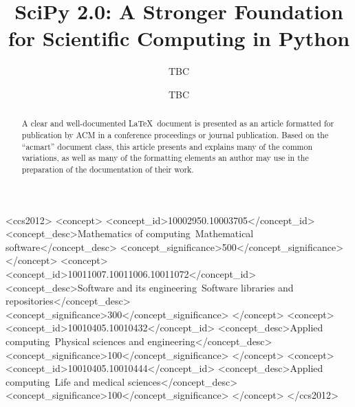 \documentclass[acmsmall]{acmart}
\begin{document}
\title{SciPy 2.0: A Stronger Foundation for Scientific Computing in Python}

\author{TBC}
\author{TBC}
\correspondingauthor
\authornotemark[1]

\renewcommand{\shortauthors}{TBC et al.}

\begin{abstract}
  A clear and well-documented \LaTeX\ document is presented as an
  article formatted for publication by ACM in a conference proceedings
  or journal publication. Based on the ``acmart'' document class, this
  article presents and explains many of the common variations, as well
  as many of the formatting elements an author may use in the
  preparation of the documentation of their work.
\end{abstract}

\begin{CCSXML}
<ccs2012>
   <concept>
       <concept_id>10002950.10003705</concept_id>
       <concept_desc>Mathematics of computing~Mathematical software</concept_desc>
       <concept_significance>500</concept_significance>
       </concept>
   <concept>
       <concept_id>10011007.10011006.10011072</concept_id>
       <concept_desc>Software and its engineering~Software libraries and repositories</concept_desc>
       <concept_significance>300</concept_significance>
       </concept>
   <concept>
       <concept_id>10010405.10010432</concept_id>
       <concept_desc>Applied computing~Physical sciences and engineering</concept_desc>
       <concept_significance>100</concept_significance>
       </concept>
   <concept>
       <concept_id>10010405.10010444</concept_id>
       <concept_desc>Applied computing~Life and medical sciences</concept_desc>
       <concept_significance>100</concept_significance>
       </concept>
 </ccs2012>
\end{CCSXML}


\end{document}
